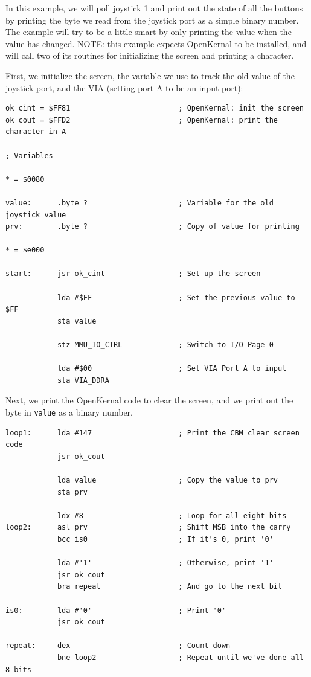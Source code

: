 In this example, we will poll joystick 1 and print out the state of all the buttons by printing the byte we read from the joystick port as a simple binary number. The example will try to be a little smart by only printing the value when the value has changed. NOTE: this example expects OpenKernal to be installed, and will call two of its routines for initializing the screen and printing a character.

First, we initialize the screen, the variable we use to track the old value of the joystick port, and the VIA (setting port A to be an input port):
\begin{verbatim}
ok_cint = $FF81                         ; OpenKernal: init the screen
ok_cout = $FFD2                         ; OpenKernal: print the character in A

; Variables

* = $0080

value:      .byte ?                     ; Variable for the old joystick value
prv:        .byte ?                     ; Copy of value for printing

* = $e000

start:      jsr ok_cint                 ; Set up the screen

            lda #$FF                    ; Set the previous value to $FF
            sta value

            stz MMU_IO_CTRL             ; Switch to I/O Page 0

            lda #$00                    ; Set VIA Port A to input
            sta VIA_DDRA
\end{verbatim}

Next, we print the OpenKernal code to clear the screen, and we print out the byte in \verb+value+ as a binary number.

\begin{verbatim}
loop1:      lda #147                    ; Print the CBM clear screen code
            jsr ok_cout

            lda value                   ; Copy the value to prv
            sta prv

            ldx #8                      ; Loop for all eight bits
loop2:      asl prv                     ; Shift MSB into the carry
            bcc is0                     ; If it's 0, print '0'

            lda #'1'                    ; Otherwise, print '1'
            jsr ok_cout
            bra repeat                  ; And go to the next bit

is0:        lda #'0'                    ; Print '0'
            jsr ok_cout

repeat:     dex                         ; Count down
            bne loop2                   ; Repeat until we've done all 8 bits
\end{verbatim}

